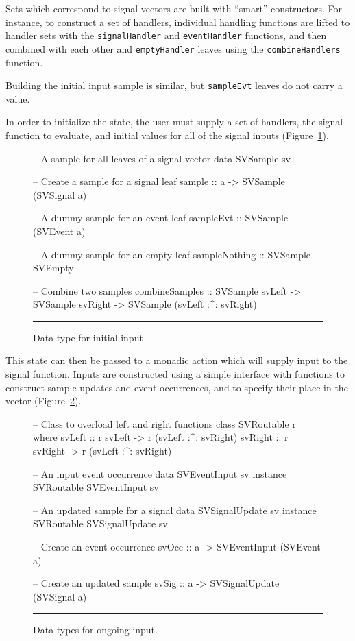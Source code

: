 Sets which correspond to signal vectors are built with ``smart'' constructors.
For instance, to construct a set of handlers, individual handling functions are
lifted to handler sets with the {\tt signalHandler} and {\tt eventHandler}
functions, and then combined with each other and {\tt emptyHandler} leaves
using the {\tt combineHandlers} function.

Building the initial input sample is similar, but {\tt sampleEvt} leaves do
not carry a value.

In order to initialize the state, the user must supply a set of handlers, the
signal function to evaluate, and initial values for all of the signal inputs
(Figure~\ref{figure:initial_input}).

\begin{figure}
\begin{code}
-- A sample for all leaves of a signal vector
data SVSample sv

-- Create a sample for a signal leaf
sample          :: a -> SVSample (SVSignal a)

-- A dummy sample for an event leaf
sampleEvt       :: SVSample (SVEvent a)

-- A dummy sample for an empty leaf
sampleNothing   :: SVSample SVEmpty

-- Combine two samples
combineSamples  ::    SVSample svLeft
                   -> SVSample svRight
                   -> SVSample (svLeft :^: svRight)
\end{code}
\hrule
\caption{Data type for initial input}
\label{figure:initial_input}
\end{figure}

This state can then be passed to a monadic action which will supply input to
the signal function. Inputs are constructed using a simple interface with
functions to construct sample updates and event occurrences, and to specify
their place in the vector (Figure~\ref{figure:ongoing_input}).

\begin{figure}
\begin{code}
-- Class to overload left and right functions
class SVRoutable r where
  svLeft          :: r svLeft -> r (svLeft :^: svRight)
  svRight         :: r svRight -> r (svLeft :^: svRight)

-- An input event occurrence
data SVEventInput sv
instance SVRoutable SVEventInput sv

-- An updated sample for a signal
data SVSignalUpdate sv
instance SVRoutable SVSignalUpdate sv

-- Create an event occurrence
svOcc           :: a -> SVEventInput (SVEvent a)

-- Create an updated sample
svSig           :: a -> SVSignalUpdate (SVSignal a)
\end{code}
\hrule
\caption{Data types for ongoing input.}
\label{figure:ongoing_input}
\end{figure}

